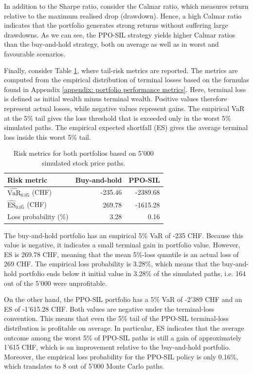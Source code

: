 In addition to the Sharpe ratio, consider the Calmar ratio, which measures return relative to the maximum realised drop (drawdown). Hence, a high Calmar ratio indicates that the portfolio generates strong returns without suffering large drawdowns. As we can see, the PPO-SIL strategy yields higher Calmar ratios than the buy-and-hold strategy, both on average as well as in worst and favourable scenarios. 

Finally, consider Table \ref{tab: risk metrics}, where tail-risk metrics are reported. The metrics are computed from the empirical distribution of terminal losses based on the formulas found in Appendix \ref{appendix: portfolio performance metrics}. Here, terminal loss is defined as initial wealth minus terminal wealth. Positive values therefore represent actual losses, while negative values represent gains. The empirical VaR at the 5\% tail gives the loss threshold that is exceeded only in the worst 5\% simulated paths. The empirical expected shortfall (ES) gives the average terminal loss inside this worst 5\% tail. 
\begin{table}[!htbp]
    \centering
    \begin{tabular}{lrr}
        \toprule
        Risk metric & Buy-and-hold & PPO-SIL \\
        \midrule
         $\widehat{\text{VaR}}_{0.05}$ (CHF) & -235.46 & -2389.68 \\
         $\widehat{\text{ES}}_{0.05}$ (CHF) & 269.78 & -1615.28 \\
         Loss probability (\%) &  3.28 & 0.16 \\
        \bottomrule
    \end{tabular}
    \caption{Risk metrics for both portfolios based on 5'000 simulated stock price paths.}
    \label{tab: risk metrics}
\end{table}
The buy-and-hold portfolio has an empirical 5\% VaR of -235 CHF. Because this value is negative, it indicates a small terminal gain in portfolio value. However, ES is 269.78 CHF, meaning that the mean 5\%-loss quantile is an actual loss of 269 CHF. The empirical loss probability is 3.28\%, which means that the buy-and-hold portfolio ends below it initial value in 3.28\% of the simulated paths, i.e. 164 out of the 5'000 were  unprofitable. 

On the other hand, the PPO-SIL portfolio has a 5\% VaR of -2'389 CHF and an ES of -1'615.28 CHF. Both values are negative under the terminal-loss convention. This means that even the 5\% tail of the PPO-SIL terminal-loss distribution is profitable on average. In particular, ES indicates that the average outcome among the worst 5\% of PPO-SIL paths is still a gain of approximately 1'615 CHF, which is an improvement relative to the buy-and-hold portfolio. Moreover, the empirical loss probability for the PPO-SIL policy is only 0.16\%, which translates to 8 out of 5'000 Monte Carlo paths. 

